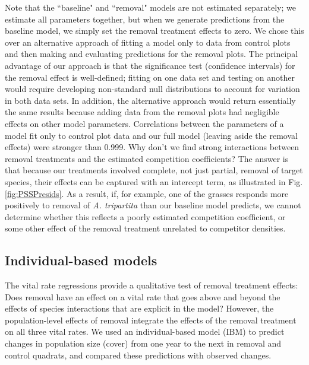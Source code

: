\documentclass[11pt]{article}
\begin{document}
\begin{doublespacing}
Note that the ``baseline" and ``removal" models are not estimated separately; we estimate all parameters together, but when we generate predictions from the baseline model, 
we simply set the removal treatment effects to zero. We chose this over an alternative approach of fitting a model only to data from control plots and then making 
and evaluating predictions for the removal plots. The principal advantage of our approach is that the significance test (confidence intervals) for the removal effect 
is well-defined; fitting on one data set and testing on another would require developing non-standard null distributions to account for variation in both data sets. In addition, the alternative approach would return 
essentially the same results because adding data from the removal plots had negligible effects on other model parameters. Correlations between the parameters of 
a model fit only to control plot data and our full model (leaving aside the removal effects) were stronger than 0.999. 
Why don't we find strong interactions between removal treatments and the estimated competition coefficients? The answer is that because our treatments 
involved complete, not just partial, removal of target species, their effects can be captured with an intercept term, as illustrated in Fig. \ref{fig:PSSPresids}. 
As a result, if, for example, one of the grasses responds more positively to removal of \textit{A. tripartita} than our baseline model predicts, we cannot 
determine whether this reflects a poorly estimated competition coefficient, or some other effect of the removal treatment unrelated to competitor densities.

\subsection*{Individual-based models}
The vital rate regressions provide a qualitative test of removal treatment effects: Does removal have an effect on a vital rate that goes above and beyond the effects of species interactions that are explicit in the model? However, the population-level effects of removal integrate the effects of the removal treatment on all three vital rates. We used an individual-based model (IBM) to predict changes in population size (cover) from one year to the next in removal and control quadrats, and compared these predictions with observed changes. 


\end{doublespacing}
\end{document}
